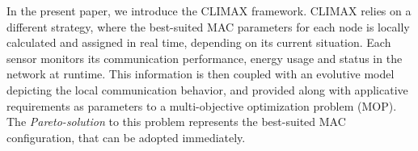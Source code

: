 \documentclass[12pt,journal,compsoc]{IEEEtran}
\begin{document}







In the present paper, we introduce the CLIMAX framework. CLIMAX relies on a different strategy, where the best-suited MAC parameters for each node is locally calculated and assigned in real time, depending on its current situation. Each sensor monitors its communication performance, energy usage and status in the network at runtime. This information is then coupled with an evolutive model depicting the local communication behavior, and provided along with applicative requirements as parameters to a multi-objective optimization problem (MOP). The \textit{Pareto-solution} to this problem represents the best-suited MAC configuration, that can be adopted immediately.
\end{document}
